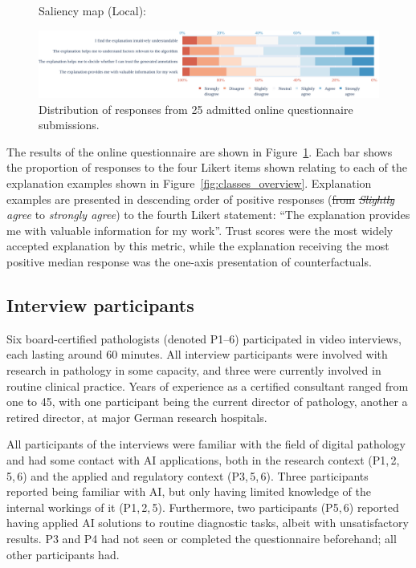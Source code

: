 \documentclass[final,5p,times,twocolumn,hyphens]{elsarticle}
\providecommand{\DIFaddtex}[1]{{\protect\color{blue}\uwave{#1}}} %
\providecommand{\DIFdeltex}[1]{{\protect\color{red}\sout{#1}}}                      %
\providecommand{\DIFaddbegin}{} %
\providecommand{\DIFaddend}{} %
\providecommand{\DIFdelbegin}{} %
\providecommand{\DIFdelend}{} %
\providecommand{\DIFadd}[1]{\texorpdfstring{\DIFaddtex{#1}}{#1}} %
\providecommand{\DIFdel}[1]{\texorpdfstring{\DIFdeltex{#1}}{}} %
\newcommand{\DIFscaledelfig}{0.5}
\newlength{\DIFdelgraphicswidth} %
\newlength{\DIFdelgraphicsheight} %
\newcommand{\DIFaddincludegraphics}[2][]{{\color{blue}\fbox{\DIFOincludegraphics[#1]{#2}}}} %
\newcommand{\DIFdelincludegraphics}[2][]{%
\sbox{\DIFdelgraphicsbox}{\DIFOincludegraphics[#1]{#2}}%
\settoboxwidth{\DIFdelgraphicswidth}{\DIFdelgraphicsbox} %
\settoboxtotalheight{\DIFdelgraphicsheight}{\DIFdelgraphicsbox} %
\scalebox{\DIFscaledelfig}{%
\parbox[b]{\DIFdelgraphicswidth}{\usebox{\DIFdelgraphicsbox}\\[-\baselineskip] \rule{\DIFdelgraphicswidth}{0em}}\llap{\resizebox{\DIFdelgraphicswidth}{\DIFdelgraphicsheight}{%
\setlength{\unitlength}{\DIFdelgraphicswidth}%
\begin{picture}(1,1)%
\thicklines\linethickness{2pt} %
{\color[rgb]{1,0,0}\put(0,0){\framebox(1,1){}}}%
{\color[rgb]{1,0,0}\put(0,0){\line( 1,1){1}}}%
{\color[rgb]{1,0,0}\put(0,1){\line(1,-1){1}}}%
\end{picture}%
}\hspace*{3pt}}} %
} %
\DeclareRobustCommand{\DIFaddbegin}{\DIFOaddbegin \let\includegraphics\DIFaddincludegraphics} %
\DeclareRobustCommand{\DIFaddend}{\DIFOaddend \let\includegraphics\DIFOincludegraphics} %
\DeclareRobustCommand{\DIFdelbegin}{\DIFOdelbegin \let\includegraphics\DIFdelincludegraphics} %
\DeclareRobustCommand{\DIFdelend}{\DIFOaddend \let\includegraphics\DIFOincludegraphics} %
\begin{document}
\begin{figure}
\begin{minipage}[c]{0.9\textwidth}
    Saliency map (Local):

    \includegraphics[width=\linewidth]{6_SaliencyMapLocal.png}
    \caption{Distribution of responses from 25 admitted online questionnaire submissions.}
\label{fig:results}
\end{minipage}
\end{figure}

The results of the online questionnaire are shown in Figure~\ref{fig:results}. Each bar shows the proportion of responses to the four Likert items shown relating to each of the explanation examples shown in Figure~\ref{fig:classes_overview}. Explanation examples are presented in descending order of \DIFaddbegin \DIFadd{total }\DIFaddend positive responses (\DIFdelbegin \DIFdel{from }\DIFdelend \textit{\DIFdelbegin \DIFdel{Slightly }\DIFdelend \DIFaddbegin \DIFadd{slightly }\DIFaddend agree} to \textit{strongly agree}) to the fourth Likert statement: ``The explanation provides me with valuable information for my work''. Trust scores were the most widely accepted explanation by this metric, while the explanation receiving the most positive median response was the one-axis presentation of counterfactuals.

\subsection{Interview participants}

Six board-certified pathologists (denoted P1--6) participated in video interviews, each lasting around 60 minutes. All interview participants were involved with research in pathology in some capacity, and three were currently involved in routine clinical practice. Years of experience as a certified consultant ranged from one to 45, with one participant being the current director of pathology, another a retired director, at major German research hospitals.

All participants of the interviews were familiar with the field of digital pathology and had some contact with AI applications, both in the research context (P1,\,2,\,5,\,6) and the applied and regulatory context (P3,\,5,\,6). Three participants reported being familiar with AI, but only having limited knowledge of the internal workings of it (P1,\,2,\,5). Furthermore, two participants (P5,\,6) reported having applied AI solutions to routine diagnostic tasks, albeit with unsatisfactory results. P3 and P4 had not seen or completed the questionnaire beforehand; all other participants had.
\end{document}
